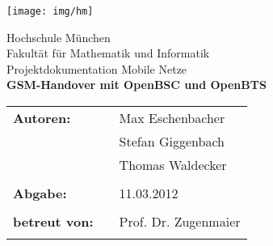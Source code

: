 %
\begin{titlepage}
\begin{flushright}
\texttt{[image: img/hm]}%
\end{flushright}

\vspace*{20mm}
\begin{center}
{\Large Hochschule München}\\
{\large Fakultät für Mathematik und Informatik}\\

\vspace*{15mm}
{\huge Projektdokumentation Mobile Netze}\\

\vspace*{10mm}
{\huge \bfseries{GSM-Handover mit OpenBSC und OpenBTS}} \\
\vspace*{15mm} 
\end{center}

\vspace*{30mm}

\begin{tabular}{lll}
\textbf{\large {Autoren:}} & & \large {Max Eschenbacher}\\
			   & & \large {Stefan Giggenbach}\\
			   & & \large {Thomas Waldecker}\\
& & \\

\textbf{\large {Abgabe:}} & & \large {11.03.2012}\\
& & \\

\textbf{\large {betreut von:}} & & \large {Prof. Dr. Zugenmaier}\\
& & \\
\end{tabular}

\end{titlepage}


\tableofcontents
\leereseite
